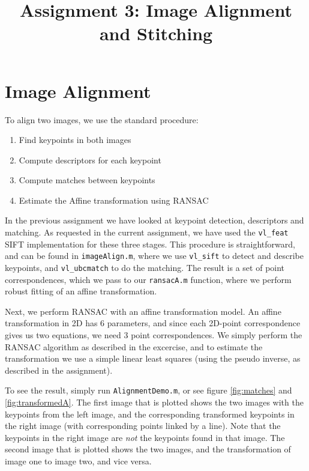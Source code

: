 \documentclass[a4paper,10pt]{article}
\title{Assignment 3: Image Alignment and Stitching}
\author{}
\begin{document}
\maketitle

\section{Image Alignment}

To align two images, we use the standard procedure:
\begin{enumerate}
 \item Find keypoints in both images
 \item Compute descriptors for each keypoint
 \item Compute matches between keypoints
 \item Estimate the Affine transformation using RANSAC
\end{enumerate}

In the previous assignment we have looked at keypoint detection, descriptors and matching.
As requested in the current assignment, we have used the \verb+vl_feat+ SIFT implementation for these three stages.
This procedure is straightforward, and can be found in \verb+imageAlign.m+, where we use \verb+vl_sift+ to detect and describe keypoints,
and \verb+vl_ubcmatch+ to do the matching.
The result is a set of point correspondences, which we pass to our \verb+ransacA.m+ function, where we perform robust fitting of an affine transformation.

Next, we perform RANSAC with an affine transformation model.
An affine transformation in 2D has $6$ parameters, and since each 2D-point correspondence gives us two equations, we need 3 point correspondences.
We simply perform the RANSAC algorithm as described in the excercise, and to estimate the transformation we use a simple linear least squares (using the pseudo inverse, as described in the assignment).

To see the result, simply run \verb+AlignmentDemo.m+, or see figure \ref{fig:matches} and \ref{fig:transformedA}.
The first image that is plotted shows the two images with the keypoints from the left image, and the corresponding transformed keypoints in the right image (with corresponding points linked by a line).
Note that the keypoints in the right image are \emph{not} the keypoints found in that image.
The second image that is plotted shows the two images, and the transformation of image one to image two, and vice versa.
\end{document}
